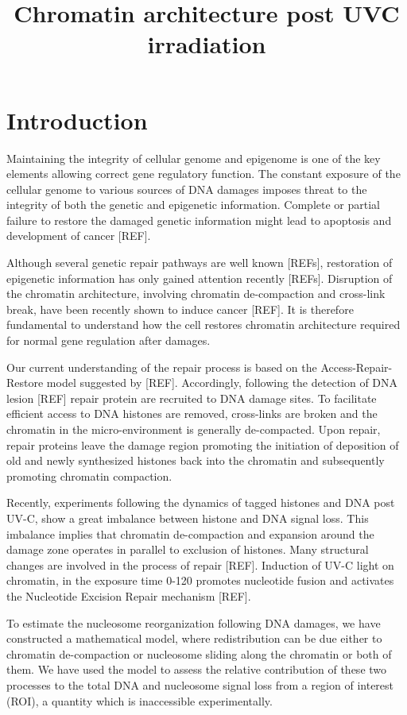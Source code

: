 \documentclass[12pt]{article}
\begin{document}
	
	\title{Chromatin architecture post UVC irradiation}
\maketitle
\section{Introduction}
    Maintaining the integrity of cellular genome and epigenome is one of the key elements allowing correct gene regulatory function. The constant exposure of the cellular genome to various sources of DNA damages imposes threat to the integrity of both the genetic and epigenetic information. Complete or partial failure to restore the damaged genetic information might lead to apoptosis and development of cancer [REF].
    
    Although several genetic repair pathways are well known [REFs], restoration of epigenetic information has only gained attention recently [REFs]. Disruption of the chromatin architecture, involving chromatin de-compaction and cross-link break, have been recently shown to induce cancer [REF]. It is therefore fundamental to understand how the cell restores chromatin architecture required for normal gene regulation after damages.
    
	Our current understanding of the repair process is based on the Access-Repair-Restore model suggested by [REF]. Accordingly, following the detection of DNA lesion [REF] repair protein are recruited to DNA damage sites. To facilitate efficient access to DNA histones are removed, cross-links are broken and the chromatin in the micro-environment is generally de-compacted. Upon repair, repair proteins leave the damage region promoting the initiation of deposition of old and newly synthesized histones back into the chromatin and subsequently promoting chromatin compaction.
    
    Recently, experiments following the dynamics of tagged histones and DNA post UV-C, show a great imbalance between histone and DNA signal loss. This imbalance implies that chromatin de-compaction and expansion around the damage zone operates in parallel to exclusion of histones. %
    Many structural changes are involved in the process of repair [REF].  Induction of UV-C light on chromatin, in the exposure time 0-120 promotes nucleotide fusion and activates the Nucleotide Excision Repair mechanism [REF].
    
	To estimate the nucleosome reorganization following DNA damages, we have
	constructed a mathematical model, where redistribution can be due either to chromatin de-compaction or nucleosome sliding along the chromatin or both of them. We have used the model to assess the relative contribution of these two processes to the total DNA and nucleosome signal loss from a region of interest (ROI), a quantity which is inaccessible experimentally.
	
\end{document}
